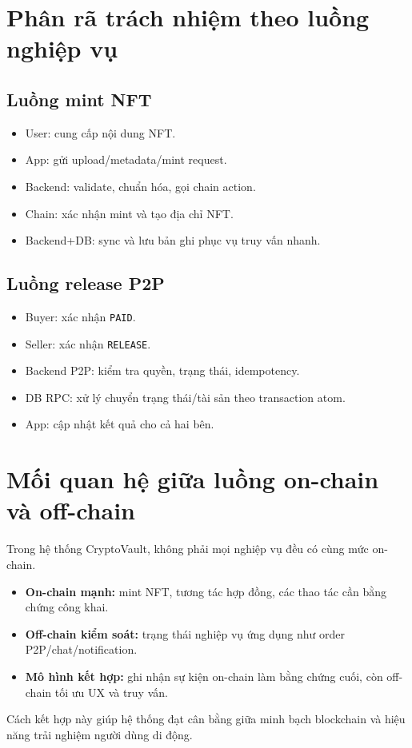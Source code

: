 \documentclass[a4paper,12pt]{report}
\begin{document}
\section{Phân rã trách nhiệm theo luồng nghiệp vụ}
\subsection{Luồng mint NFT}
\begin{itemize}
    \item User: cung cấp nội dung NFT.
    \item App: gửi upload/metadata/mint request.
    \item Backend: validate, chuẩn hóa, gọi chain action.
    \item Chain: xác nhận mint và tạo địa chỉ NFT.
    \item Backend+DB: sync và lưu bản ghi phục vụ truy vấn nhanh.
\end{itemize}

\subsection{Luồng release P2P}
\begin{itemize}
    \item Buyer: xác nhận \texttt{PAID}.
    \item Seller: xác nhận \texttt{RELEASE}.
    \item Backend P2P: kiểm tra quyền, trạng thái, idempotency.
    \item DB RPC: xử lý chuyển trạng thái/tài sản theo transaction atom.
    \item App: cập nhật kết quả cho cả hai bên.
\end{itemize}

\section{Mối quan hệ giữa luồng on-chain và off-chain}
Trong hệ thống CryptoVault, không phải mọi nghiệp vụ đều có cùng mức on-chain.
\begin{itemize}
    \item \textbf{On-chain mạnh:} mint NFT, tương tác hợp đồng, các thao tác cần bằng chứng công khai.
    \item \textbf{Off-chain kiểm soát:} trạng thái nghiệp vụ ứng dụng như order P2P/chat/notification.
    \item \textbf{Mô hình kết hợp:} ghi nhận sự kiện on-chain làm bằng chứng cuối, còn off-chain tối ưu UX và truy vấn.
\end{itemize}
Cách kết hợp này giúp hệ thống đạt cân bằng giữa minh bạch blockchain và hiệu năng trải nghiệm người dùng di động.
\end{document}
